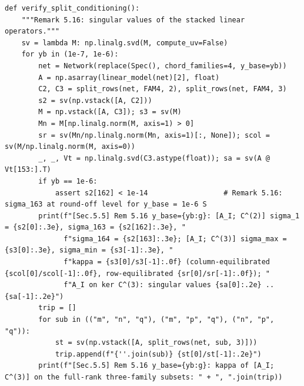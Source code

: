 \documentclass[11pt,a4paper]{article}
\theoremstyle{definition}
\theoremstyle{remark}
\begin{document}
\begin{lstlisting}
def verify_split_conditioning():
    """Remark 5.16: singular values of the stacked linear operators."""
    sv = lambda M: np.linalg.svd(M, compute_uv=False)
    for yb in (1e-7, 1e-6):
        net = Network(replace(Spec(), chord_families=4, y_base=yb))
        A = np.asarray(linear_model(net)[2], float)
        C2, C3 = split_rows(net, FAM4, 2), split_rows(net, FAM4, 3)
        s2 = sv(np.vstack([A, C2]))
        M = np.vstack([A, C3]); s3 = sv(M)
        Mn = M[np.linalg.norm(M, axis=1) > 0]
        sr = sv(Mn/np.linalg.norm(Mn, axis=1)[:, None]); scol = sv(M/np.linalg.norm(M, axis=0))
        _, _, Vt = np.linalg.svd(C3.astype(float)); sa = sv(A @ Vt[153:].T)
        if yb == 1e-6:
            assert s2[162] < 1e-14                  # Remark 5.16: sigma_163 at round-off level for y_base = 1e-6 S
        print(f"[Sec.5.5] Rem 5.16 y_base={yb:g}: [A_I; C^(2)] sigma_1 = {s2[0]:.3e}, sigma_163 = {s2[162]:.3e}, "
              f"sigma_164 = {s2[163]:.3e}; [A_I; C^(3)] sigma_max = {s3[0]:.3e}, sigma_min = {s3[-1]:.3e}, "
              f"kappa = {s3[0]/s3[-1]:.0f} (column-equilibrated {scol[0]/scol[-1]:.0f}, row-equilibrated {sr[0]/sr[-1]:.0f}); "
              f"A_I on ker C^(3): singular values {sa[0]:.2e} .. {sa[-1]:.2e}")
        trip = []
        for sub in (("m", "n", "q"), ("m", "p", "q"), ("n", "p", "q")):
            st = sv(np.vstack([A, split_rows(net, sub, 3)]))
            trip.append(f"{''.join(sub)} {st[0]/st[-1]:.2e}")
        print(f"[Sec.5.5] Rem 5.16 y_base={yb:g}: kappa of [A_I; C^(3)] on the full-rank three-family subsets: " + ", ".join(trip))



\end{lstlisting}
\end{document}
